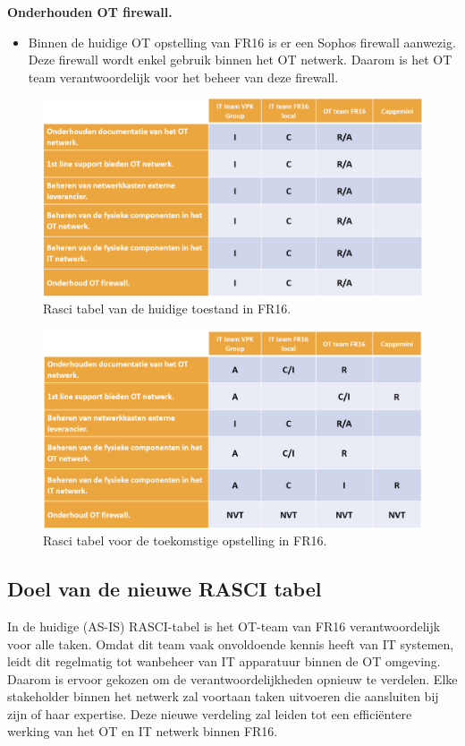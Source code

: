 \textbf{Onderhouden OT firewall.}
\begin{itemize}[label=\textbullet]
    \item Binnen de huidige OT opstelling van FR16 is er een Sophos firewall aanwezig. Deze firewall wordt enkel gebruik binnen het OT netwerk. Daarom is het OT team verantwoordelijk voor het beheer van deze firewall.
\end{itemize}



\begin{figure}[H]
    \centering
    \includegraphics[width=1\textwidth]{fotos/Rasci_AS-IS.png}
    \caption[Foto Rasci AS-IS]{\label{fig:grail}Rasci tabel van de huidige toestand in FR16.}
\end{figure} 

\begin{figure}[H]
    \centering
    \includegraphics[width=1\textwidth]{fotos/Rasci_TO-BE.png}
    \caption[Foto Rasci TO-BE]{\label{fig:grail}Rasci tabel voor de toekomstige opstelling in FR16.}
\end{figure} 


\subsection{Doel van de nieuwe RASCI tabel}
In de huidige (AS-IS) RASCI-tabel is het OT-team van FR16 verantwoordelijk voor alle taken. Omdat dit team vaak onvoldoende kennis heeft van IT systemen, leidt dit regelmatig tot wanbeheer van IT apparatuur binnen de OT omgeving. \newline
Daarom is ervoor gekozen om de verantwoordelijkheden opnieuw te verdelen. Elke stakeholder binnen het netwerk zal voortaan taken uitvoeren die aansluiten bij zijn of haar expertise. Deze nieuwe verdeling zal leiden tot een efficiëntere werking van het OT en IT netwerk binnen FR16.

